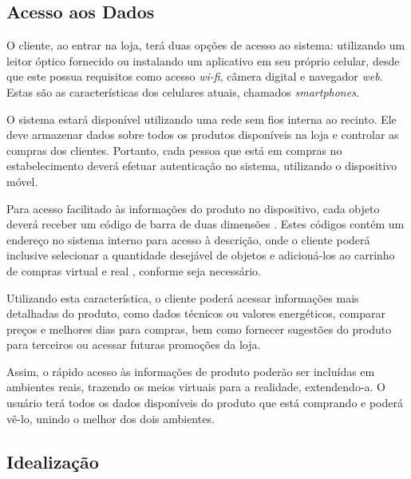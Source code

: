 \documentclass{article}
\begin{document}
\subsection{Acesso aos Dados}


O cliente, ao entrar na loja, terá duas opções de acesso ao sistema: utilizando
um leitor óptico fornecido ou instalando um aplicativo em seu próprio celular,
desde que este possua requisitos como acesso \emph{wi-fi}, câmera digital e
navegador \emph{web}. Estas são as características dos celulares atuais,
chamados \emph{smartphones}.


O sistema estará disponível utilizando uma rede sem fios interna ao recinto. Ele
deve armazenar dados sobre todos os produtos disponíveis na loja e controlar as
compras dos clientes. Portanto, cada pessoa que está em compras no
estabelecimento deverá efetuar autenticação no sistema, utilizando o dispositivo
móvel.


Para acesso facilitado às informações do produto no dispositivo, cada objeto
deverá receber um código de barra de duas dimensões \cite{alapetite2010}. Estes
códigos contém um endereço no sistema interno para acesso à descrição, onde o
cliente poderá inclusive selecionar a quantidade desejável de objetos e
adicioná-los ao carrinho de compras virtual e real \cite{dix2000}, conforme seja
necessário.


Utilizando esta característica, o cliente poderá acessar informações mais
detalhadas do produto, como dados técnicos ou valores energéticos, comparar
preços e melhores dias para compras, bem como fornecer sugestões do produto para
terceiros \cite{canny2006} ou acessar futuras promoções da loja.


Assim, o rápido acesso às informações de produto poderão ser incluídas em
ambientes reais, trazendo os meios virtuais para a realidade, extendendo-a. O
usuário terá todos os dados disponíveis do produto que está comprando e poderá
vê-lo, unindo o melhor dos dois ambientes.

\subsection{Idealização}
\end{document}
